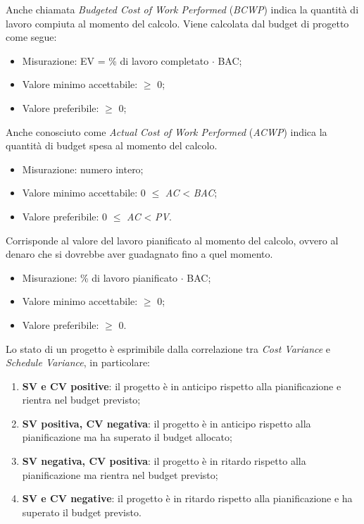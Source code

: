 		Anche chiamata \textit{Budgeted Cost of Work Performed} (\textit{BCWP}) indica la quantità di lavoro compiuta al momento del calcolo. Viene calcolata dal budget di progetto come segue:
		\begin{itemize}
			\item{Misurazione: EV =  \% di lavoro completato $\cdot$ BAC;}
			\item{Valore minimo accettabile: $\geq$ 0;}
			\item{Valore preferibile: $\geq$ 0;}
		\end{itemize}
				
		Anche conosciuto come \textit{Actual Cost of Work Performed} (\textit{ACWP}) indica la quantità di budget spesa al momento del calcolo.
		\begin{itemize}
			\item{Misurazione: numero intero;}
			\item{Valore minimo accettabile: 0 $\leq$ \textit{AC} < \textit{BAC};}
			\item{Valore preferibile: 0 $\leq$ \textit{AC} < \textit{PV}.}
		\end{itemize}
		
		Corrisponde al valore del lavoro pianificato al momento del calcolo, ovvero al denaro che si dovrebbe aver guadagnato fino a quel momento.
		\begin{itemize}
			\item{Misurazione: \% di lavoro pianificato $\cdot$ BAC;}
			\item{Valore minimo accettabile: $\geq$ 0;}
			\item{Valore preferibile: $\geq$ 0.}
		\end{itemize}
		
		Lo stato di un progetto è esprimibile dalla correlazione tra \textit{Cost Variance} e \textit{Schedule Variance}, in particolare:
		\begin{enumerate}
			\item{\textbf{SV e CV positive}: il progetto è in anticipo rispetto alla pianificazione e rientra nel budget previsto;}
			\item{\textbf{SV positiva, CV negativa}: il progetto è in anticipo rispetto alla pianificazione ma ha superato il budget allocato;}
			\item{\textbf{SV negativa, CV positiva}: il progetto è in ritardo rispetto alla pianificazione ma rientra nel budget previsto;}
			\item{\textbf{SV e CV negative}: il progetto è in ritardo rispetto alla pianificazione e ha superato il budget previsto.}
		\end{enumerate}
				
